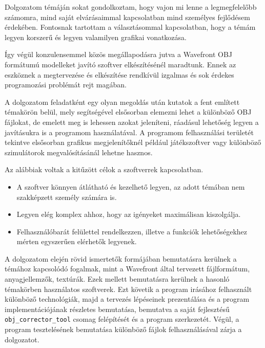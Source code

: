 
Dolgozatom témáján sokat gondolkoztam, hogy vajon mi lenne a legmegfelelőbb számomra, mind saját elvárásaimmal kapcsolatban mind személyes fejlődésem érdekében. Fontosnak tartottam a választásommal kapcsolatban, hogy a témám legyen korszerű és legyen valamilyen grafikai vonatkozása.

Így végül konzulensemmel közös megállapodásra jutva a Wavefront OBJ formátumú modelleket javító szoftver elkészítésénél maradtunk. Ennek az eszköznek a megtervezése és elkészítése rendkívül izgalmas és sok érdekes programozási problémát rejt magában.

A dolgozatom feladatként egy olyan megoldás után kutatok a fent említett témakörön belül, mely segítségével elsősorban elemezni lehet a különböző OBJ fájlokat, de emelett meg is lehessen azokat jeleníteni, ráadásul lehetőség legyen  a javításukra is a programom használatával. A programom felhasználási területét tekintve elsősorban grafikus megjelenítőknél például játékszoftver  vagy különböző szimulátorok megvalósításánál lehetne hasznos.

Az alábbiak voltak a kitűzött célok a szoftverrek kapcsolatban.
\begin{itemize}
\item A szoftver könnyen átlátható és kezelhető legyen, az adott témában nem szakképzett
személy számára is.
\item Legyen elég komplex ahhoz, hogy  az igényeket maximálisan kiszolgálja.
\item Felhasználóbarát felülettel rendelkezzen, illetve a funkciók lehetőségekhez mérten egyszerűen elérhetők legyenek.
\end{itemize}

A dolgozatom elején rövid ismertetők formájában bemutatásra kerülnek a témához kapcsolódó fogalmak, mint a Wavefront által tervezett fájlformátum, anyagjellemzők, textúrák. Ezek mellett bemutatásra kerülnek a hasonló témakörben használatos szoftverek. Ezt követik a program irásához felhasznált különböző technológiák, majd a tervezés lépéseinek prezentálása és a program implementációjának részletes bemutatása, bemutatva a saját fejlesztésű \texttt{obj\_corrector\_tool} csomag felépítését és a program szerkezetét. Végül, a program tesztelésének bemutatása különböző fájlok felhasználásával zárja a dolgozatot.



